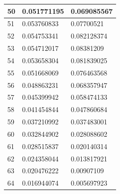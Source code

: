 \documentclass[a4paper]{article}
\begin{document}
\begin{table}[!h]
\begin{center}
\begin{tabular}{|l|l|l|}
50                       & 0.051771195                                           & 0.069085567                                       \\ \hline
51                       & 0.053760833                                           & 0.07700521                                        \\ \hline
52                       & 0.054753341                                           & 0.082128374                                       \\ \hline
53                       & 0.054712017                                           & 0.08381209                                        \\ \hline
54                       & 0.053658304                                           & 0.081839025                                       \\ \hline
55                       & 0.051668069                                           & 0.076463568                                       \\ \hline
56                       & 0.048863231                                           & 0.068357947                                       \\ \hline
57                       & 0.045399942                                           & 0.058474133                                       \\ \hline
58                       & 0.041454844                                           & 0.047860684                                       \\ \hline
59                       & 0.037210992                                           & 0.037483001                                       \\ \hline
60                       & 0.032844902                                           & 0.028088602                                       \\ \hline
61                       & 0.028515837                                           & 0.020140314                                       \\ \hline
62                       & 0.024358044                                           & 0.013817921                                       \\ \hline
63                       & 0.020476222                                           & 0.00907109                                        \\ \hline
64                       & 0.016944074                                           & 0.005697923                                       \\ \hline

\end{tabular}
\end{center}
\end{table}
\end{document}
